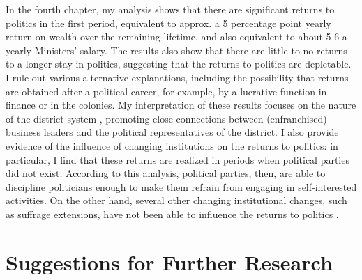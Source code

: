 In the fourth chapter, my analysis shows that there are significant returns to politics in the first period, equivalent to approx. a 5 percentage point yearly return on wealth over the remaining lifetime, and also equivalent to about 5-6 a yearly Ministers' salary. The results also show that there are little to no returns to a longer stay in politics, suggesting that the returns to politics are depletable. I rule out various alternative explanations, including the possibility that returns are obtained after a political career, for example, by a lucrative function in finance or in the colonies. My interpretation of these results focuses on the nature of the district system \citep{van2018tussen}, promoting close connections between (enfranchised) business leaders and the political representatives of the district. I also provide evidence of the influence of changing institutions on the returns to politics: in particular, I find that these returns are realized in periods when political parties did not exist. According to this analysis, political parties, then, are able to discipline politicians enough to make them refrain from engaging in self-interested activities. On the other hand, several other changing institutional changes, such as suffrage extensions, have not been able to influence the returns to politics \citep{ashworth2010does}. 


\section{Suggestions for Further Research}


